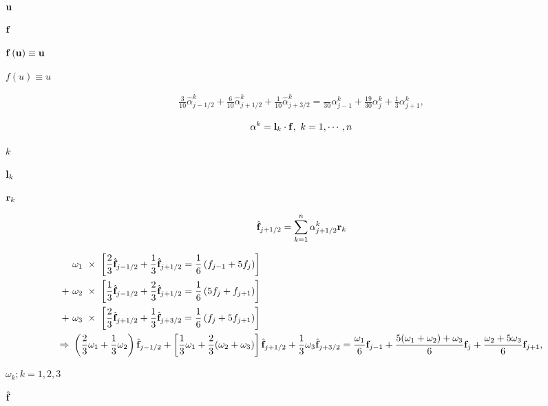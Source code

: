 \documentclass{article}
\begin{document}
${\bf u}$
\pagebreak

${\bf f}$
\pagebreak

${\bf f}\left({\bf u}\right) \equiv {\bf u}$
\pagebreak

$f(u) \equiv u$
\pagebreak

\begin{align} \frac{3}{10}\hat{\alpha}^k_{j-1/2} + \frac{6}{10}\hat{\alpha}^k_{j+1/2} + \frac{1}{10}\hat{\alpha}^k_{j+3/2} = \frac{}{30}{\alpha}^k_{j-1} + \frac{19}{30}{\alpha}^k_j + \frac{1}{3}{\alpha}^k_{j+1}, \end{align}
\pagebreak

\begin{equation} \alpha^k = {\bf l}_k \cdot {\bf f},\ k=1,\cdots,n \end{equation}
\pagebreak

$k$
\pagebreak

${\bf l}_k$
\pagebreak

${\bf r}_k$
\pagebreak

\begin{equation} \hat{\bf f}_{j+1/2} = \sum_{k=1}^n \alpha^k_{j+1/2} {\bf r}_k \end{equation}
\pagebreak

\begin{align} &\ \omega_1\ \times\ \left[ \frac{2}{3}\hat{\bf f}_{j-1/2} + \frac{1}{3}\hat{\bf f}_{j+1/2} = \frac{1}{6} \left( f_{j-1} + 5f_j \right) \right]\\ + &\ \omega_2\ \times\ \left[ \frac{1}{3}\hat{\bf f}_{j-1/2}+\frac{2}{3}\hat{\bf f}_{j+1/2} = \frac{1}{6} \left( 5f_j + f_{j+1} \right) \right] \\ + &\ \omega_3\ \times\ \left[ \frac{2}{3}\hat{\bf f}_{j+1/2} + \frac{1}{3}\hat{\bf f}_{j+3/2} = \frac{1}{6} \left( f_j + 5f_{j+1} \right) \right] \\ \Rightarrow &\ \left(\frac{2}{3}\omega_1+\frac{1}{3}\omega_2\right)\hat{\bf f}_{j-1/2} + \left[\frac{1}{3}\omega_1+\frac{2}{3}(\omega_2+\omega_3)\right]\hat{\bf f}_{j+1/2} + \frac{1}{3}\omega_3\hat{\bf f}_{j+3/2} = \frac{\omega_1}{6}{\bf f}_{j-1} + \frac{5(\omega_1+\omega_2)+\omega_3}{6}{\bf f}_j + \frac{\omega_2+5\omega_3}{6}{\bf f}_{j+1}, \end{align}
\pagebreak

$\omega_k; k=1,2,3$
\pagebreak

$\hat{\bf f}$
\pagebreak
\end{document}
